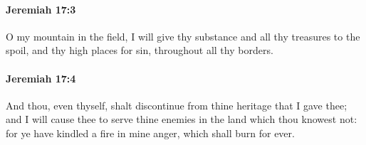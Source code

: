 		\paragraph{Jeremiah 17:3} %
			\label{JEREMIAH-17-3}

			O my mountain in the field, I will give thy substance and all thy treasures to the spoil, and thy high places for sin, throughout all thy borders.


		\paragraph{Jeremiah 17:4} %
			\label{JEREMIAH-17-4}

			And thou, even thyself, shalt discontinue from thine heritage that I gave thee; and I will cause thee to serve thine enemies in the land which thou knowest not: for ye have kindled a fire in mine anger, which shall burn for ever.

